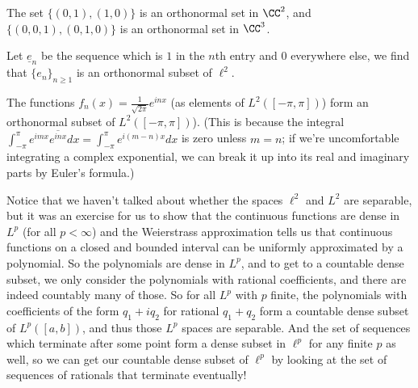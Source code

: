 \begin{example}
The set $\{(0, 1), (1, 0)\}$ is an orthonormal set in $\CC^2$, and $\{(0, 0, 1), (0, 1, 0)\}$ is an orthonormal set in $\CC^3$. 
\end{example}

\begin{example}
Let $\underline{e}_n$ be the sequence which is $1$ in the $n$th entry and $0$ everywhere else, we find that $\{e_n\}_{n \ge 1}$ is an orthonormal subset of $\ell^2$.
\end{example}

\begin{example}
The functions $f_n(x) = \frac{1}{\sqrt{2\pi}} e^{inx}$ (as elements of $L^2([-\pi, \pi])$) form an orthonormal subset of $L^2([-\pi, \pi])$). (This is because the integral $\int_{-\pi}^{\pi} e^{imx} \overline{e^{inx}} dx = \int_{-\pi}^{\pi} e^{i(m-n)x} dx$ is zero unless $m = n$; if we're uncomfortable integrating a complex exponential, we can break it up into its real and imaginary parts by Euler's formula.)
\end{example}

Notice that we haven't talked about whether the spaces $\ell^2$ and $L^2$ are separable, but it was an exercise for us to show that the continuous functions are dense in $L^p$ (for all $p < \infty$) and the Weierstrass approximation tells us that continuous functions on a closed and bounded interval can be uniformly approximated by a polynomial. So the polynomials are dense in $L^p$, and to get to a countable dense subset, we only consider the polynomials with rational coefficients, and there are indeed countably many of those. So for all $L^p$ with $p$ finite, the polynomials with coefficients of the form $q_1 + i q_2$ for rational $q_1 + q_2$ form a countable dense subset of $L^p([a, b])$, and thus those $L^p$ spaces are separable. And the set of sequences which terminate after some point form a dense subset in $\ell^p$ for any finite $p$ as well, so we can get our countable dense subset of $\ell^p$ by looking at the set of sequences of rationals that terminate eventually!

